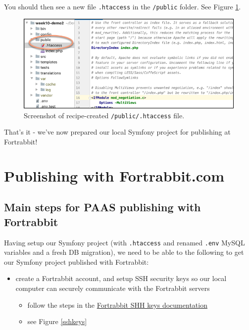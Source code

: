 \documentclass[a4paperpaper,openright]{book}
\begin{document}
You should then see a new file \texttt{.htaccess} in the
\texttt{/public} folder. See Figure \ref{htaccess}.

\begin{figure}
\centering
\includegraphics{./tex2pdf.-5a4428120ede4be1/e64fef28d6b71f1e73a309396ae3ee2eb5bc20d6.png}
\caption{Screenshot of recipe-created \texttt{/public/.htaccess}
file.\label{htaccess}}
\end{figure}

That's it - we've now prepared our local Symfony project for publishing
at Fortrabbit!

\hypertarget{publishing-with-fortrabbit.com}{%
\chapter{Publishing with
Fortrabbit.com}\label{publishing-with-fortrabbit.com}}

\hypertarget{main-steps-for-paas-publishing-with-fortrabbit}{%
\section{Main steps for PAAS publishing with
Fortrabbit}\label{main-steps-for-paas-publishing-with-fortrabbit}}

Having setup our Symfony project (with \texttt{.htaccess} and renamed
\texttt{.env} MySQL variables and a fresh DB migration), we need to be
able to the following to get our Symfony project published with
Fortrabbit:

\begin{itemize}
\item
  create a Fortrabbit account, and setup SSH security keys so our local
  computer can securely communicate with the Fortrabbit servers

  \begin{itemize}
  \item
    follow the steps in the
    \href{https://help.fortrabbit.com/ssh-keys}{Fortrabbit SHH keys
    documentation}
  \item
    see Figure \ref{sshkeys}
  \end{itemize}
\end{itemize}
\end{document}
